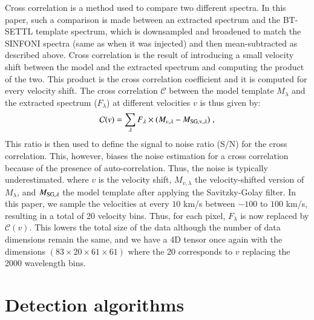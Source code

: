 \documentclass[referee]{aa} %
\begin{document}
Cross correlation is a method used to compare two different spectra.
In this paper, such a comparison is made between an extracted spectrum and the BT-SETTL template spectrum, which is downsampled and broadened to match the SINFONI spectra (same as when it was injected) and then mean-subtracted as described above.
Cross correlation is the result of introducing a small velocity shift between the model and the extracted spectrum and computing the product of the two.
This product is the cross correlation coefficient and it is computed for every velocity shift.
The cross correlation $\mathcal{C}$ between the model template $M_{\lambda}$ and the extracted spectrum ($F_{\lambda}$) at different velocities $v$ is thus given by:
\begin{equation}
    \mathcal{C}(v) = \sum\limits_{\lambda}F_{\rm{\lambda}}\times (M_{v,\lambda}-M_{\rm{SG},v,\lambda})  \; ,
    \label{eq:CC equation}
\end{equation}
This ratio is then used to define the signal to noise ratio (S/N) for the cross correlation.
This, however, biases the noise estimation for a cross correlation because of the presence of auto-correlation.
Thus, the noise is typically underestimated.
where $v$ is the velocity shift, $M_{v,\lambda}$ the velocity-shifted version of $M_{\lambda}$, and $M_{\rm{SG},\lambda}$ the model template after applying the Savitzky-Golay filter.
In this paper, we sample the velocities at every $10$ km/s between $-100$ to $100$ km/s, resulting in a total of 20 velocity bins. Thus, for each pixel, $F_\lambda$ is now replaced by $\mathcal{C}(v)$. This lowers the total size of the data although the number of data dimensions remain the same, and we have a 4D tensor once again with the dimensions $\left(83\times20\times61\times61\right)$ where the 20 corresponds to $v$ replacing the 2000 wavelength bins.



\section{Detection algorithms}
\label{sec:mapbased}
\end{document}
